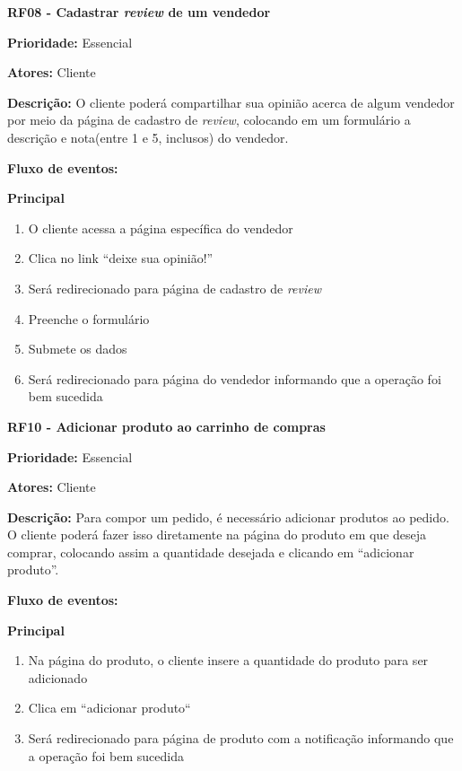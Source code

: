 \textbf{RF08 - Cadastrar \textit{review} de um vendedor} \par
\textbf{Prioridade:} Essencial \par
\textbf{Atores:} Cliente \par
\textbf{Descrição:} O cliente poderá compartilhar sua opinião acerca de algum vendedor por meio da página de cadastro de \textit{review}, colocando em um formulário a descrição e nota(entre 1 e 5, inclusos) do vendedor. \par
\textbf{Fluxo de eventos:} \par
\textbf{Principal} \par
\begin{enumerate}
  \item O cliente acessa a página específica do vendedor
  \item Clica no link “deixe sua opinião!”
  \item Será redirecionado para página de cadastro de \textit{review}
  \item Preenche o formulário
  \item Submete os dados
  \item Será redirecionado para página do vendedor informando que a operação foi bem sucedida
\end{enumerate}

\textbf{RF10 - Adicionar produto ao carrinho de compras} \par
\textbf{Prioridade:} Essencial \par
\textbf{Atores:} Cliente \par
\textbf{Descrição:} Para compor um pedido, é necessário adicionar produtos ao pedido. O cliente poderá fazer isso diretamente na página do produto em que deseja comprar, colocando assim a quantidade desejada e clicando em “adicionar produto”. \par
\textbf{Fluxo de eventos:} \par
\textbf{Principal} \par
\begin{enumerate}
  \item Na página do produto, o cliente insere a quantidade do produto para ser adicionado
  \item Clica em “adicionar produto“
  \item Será redirecionado para página de produto com a notificação informando que a operação foi bem sucedida
\end{enumerate}

